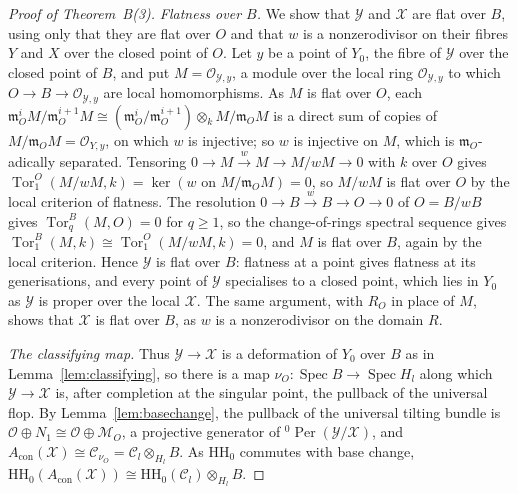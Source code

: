 \documentclass[11pt]{amsart}
\numberwithin{table}{section}
\numberwithin{figure}{section}
\numberwithin{equation}{section}
\theoremstyle{definition}
\theoremstyle{plain}
\newcommand{\Acon}{A_{\mathrm{con}}}
\newcommand{\cC}{\mathcal{C}}
\newcommand{\cO}{\mathcal{O}}
\newcommand{\HH}{\mathrm{HH}}
\DeclareMathOperator{\Spec}{Spec}
\DeclareMathOperator{\Tor}{Tor}
\DeclareMathOperator{\Per}{Per}
\begin{document}
\begin{proof}[Proof of Theorem~B(3)]
\emph{Flatness over $B$.} We show that $\mathcal Y$ and $\mathcal X$ are flat over $B$, using only that they are flat over $O$ and that $w$ is a nonzerodivisor on their fibres $Y$ and $X$ over the closed point of $O$. Let $y$ be a point of $Y_0$, the fibre of $\mathcal Y$ over the closed point of $B$, and put $M = \cO_{\mathcal Y, y}$, a module over the local ring $\cO_{\mathcal Y, y}$ to which $O \to B \to \cO_{\mathcal Y, y}$ are local homomorphisms. As $M$ is flat over $O$, each $\mathfrak m_O^i M/\mathfrak m_O^{i+1} M \cong (\mathfrak m_O^i/\mathfrak m_O^{i+1}) \otimes_k M/\mathfrak m_O M$ is a direct sum of copies of $M/\mathfrak m_O M = \cO_{Y, y}$, on which $w$ is injective; so $w$ is injective on $M$, which is $\mathfrak m_O$-adically separated. Tensoring $0 \to M \xrightarrow{w} M \to M/wM \to 0$ with $k$ over $O$ gives $\Tor_1^O(M/wM, k) = \ker(w \text{ on } M/\mathfrak m_O M) = 0$, so $M/wM$ is flat over $O$ by the local criterion of flatness. The resolution $0 \to B \xrightarrow{w} B \to O \to 0$ of $O = B/wB$ gives $\Tor_q^B(M, O) = 0$ for $q \ge 1$, so the change-of-rings spectral sequence gives $\Tor_1^B(M, k) \cong \Tor_1^O(M/wM, k) = 0$, and $M$ is flat over $B$, again by the local criterion. Hence $\mathcal Y$ is flat over $B$: flatness at a point gives flatness at its generisations, and every point of $\mathcal Y$ specialises to a closed point, which lies in $Y_0$ as $\mathcal Y$ is proper over the local $\mathcal X$. The same argument, with $R_O$ in place of $M$, shows that $\mathcal X$ is flat over $B$, as $w$ is a nonzerodivisor on the domain $R$.

\emph{The classifying map.} Thus $\mathcal Y \to \mathcal X$ is a deformation of $Y_0$ over $B$ as in Lemma~\ref{lem:classifying}, so there is a map $\nu_O\colon \Spec B \to \Spec H_l$ along which $\mathcal Y \to \mathcal X$ is, after completion at the singular point, the pullback of the universal flop. By Lemma~\ref{lem:basechange}, the pullback of the universal tilting bundle is $\cO \oplus N_1 \cong \cO \oplus \mathcal M_O$, a projective generator of ${}^0\Per(\mathcal Y/\mathcal X)$, and $\Acon(\mathcal X) \cong \cC_{\nu_O} = \cC_l \otimes_{H_l} B$. As $\HH_0$ commutes with base change, $\HH_0(\Acon(\mathcal X)) \cong \HH_0(\cC_l) \otimes_{H_l} B$.


\end{proof}
\end{document}
